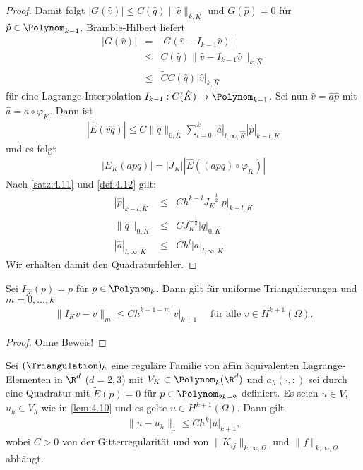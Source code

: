 \begin{proof}
    Damit folgt
    $|G(\hat v)| \le C(\hat q) \|\hat v\|_{k,\hat K}$ und
    $G(\hat p) = 0$ für $\hat p\in \Polynom_{k-1}$.
    Bramble-Hilbert liefert
    \begin{eqnarray*}
            |G(\hat v)|
        &=& |G(\hat v - I_{k-1} \hat v)| \\
        &\le& C(\hat q) \|\hat v - I_{k-1} \hat v\|_{k,\hat K} \\
        &\le& \tilde C C(\hat q) |\hat v|_{k,\hat K}
    \end{eqnarray*}
    für eine Lagrange-Interpolation $I_{k-1}: C(\hat K) \to \Polynom_{k-1}$.
    Sei nun $\hat v = \hat a \hat p$ mit $\hat a = a \circ \varphi_K$.
    Dann ist
    \begin{eqnarray*}
            |\hat E(\hat v \hat q)|
        \le C \|\hat q\|_{0,\hat K} \sum_{l=0}^k |\hat a|_{l,\infty,\hat K}
              |\hat p|_{k-l,\hat K}
    \end{eqnarray*}
    und es folgt
    \begin{eqnarray*}
          |E_K(apq)|
        = |J_K| |\hat E((apq) \circ \varphi_K)|
    \end{eqnarray*}
    Nach \eqref{satz:4.11} und \eqref{def:4.12} gilt:
    \begin{eqnarray*}
              |\hat p|_{k-l,\hat K}
        &\le& C h^{k-l} J_K^{-\frac{1}{2}} |p|_{k-l,K} \\
              \|\hat q\|_{0,\hat K}
        &\le& C J_K^{-\frac{1}{2}} |q|_{0,K} \\
              |\hat a|_{l,\infty,\hat K}
        &\le& C h^l |a|_{l,\infty,K}.
    \end{eqnarray*}
    Wir erhalten damit den Quadraturfehler.
\end{proof}


\begin{Satz}
    \label{satz:4.14}
    Sei $I_{\hat K}(p) = p$ für $p\in \Polynom_k$. Dann gilt für uniforme
    Triangulierungen und $m = 0, \dots, k$ 
    \begin{eqnarray*}
            \|I_K v - v\|_m
        \le C h^{k+1-m} |v|_{k+1} 
        \quad \text{ für alle } v\in H^{k+1}(\Omega).
    \end{eqnarray*}
\end{Satz}


\begin{proof}
    Ohne Beweis!
\end{proof}


\begin{Satz}
    \label{satz:4.15}
    Sei $(\Triangulation)_h$ eine reguläre Familie von affin äquivalenten
    Lagrange-Elementen in $\R^d$ ($d = 2, 3$) mit $V_K \subset \Polynom_k(\R^d)$
    und $a_h(\cdot, :)$ sei durch eine Quadratur mit $\tilde E(p) = 0$ für
    $p\in \Polynom_{2k - 2}$ definiert.
    Es seien $u\in V$, $u_h\in V_h$ wie in \eqref{lem:4.10} und es gelte
    $u\in H^{k+1}(\Omega)$. Dann  gilt
    \begin{eqnarray*}
        \|u - u_h\|_1 \le C h^k |u|_{k+1},
    \end{eqnarray*}
    wobei $C > 0$ von der Gitterregularität und von
    $\|K_{ij}\|_{k,\infty,\Omega}$ und $\|f\|_{k,\infty,\Omega}$ abhängt.
\end{Satz}


